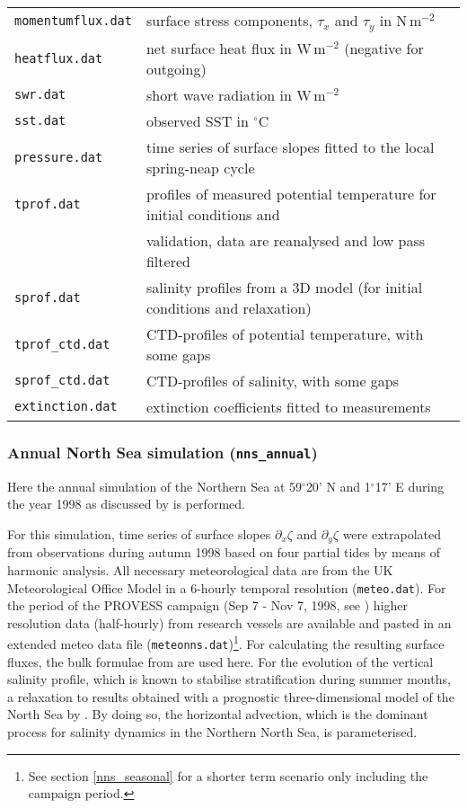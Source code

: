 \begin{tabular}{ll}
{\tt momentumflux.dat}&  surface stress components, $\tau_x$ and $\tau_y$ in N\,m$^{-2}$ \\
{\tt heatflux.dat}    &  net surface heat flux in W\,m$^{-2}$ (negative for outgoing)\\
{\tt swr.dat}         &  short wave radiation in W\,m$^{-2}$ \\ 
{\tt sst.dat}         &  observed SST in $^{\circ}$C \\ 
{\tt pressure.dat}    & time series of surface slopes fitted to the local spring-neap cycle  \\ 
{\tt tprof.dat}       & profiles of measured potential temperature for initial conditions and \\ & validation, data are reanalysed and low pass filtered \\  
{\tt sprof.dat}       & salinity profiles from a 3D model (for initial conditions and relaxation) \\   
{\tt tprof\_ctd.dat}  & CTD-profiles of potential temperature, with some gaps \\
{\tt sprof\_ctd.dat}  & CTD-profiles of salinity, with some gaps \\
{\tt extinction.dat}  & extinction coefficients fitted to measurements \\  
\end{tabular}


\subsubsection{Annual North Sea simulation ({\tt nns\_annual})}\label{nns_annual}

Here the annual simulation of the Northern Sea at 59$^{\circ}$20' N
and 1$^{\circ}$17' E during the year 1998 as discussed
by \cite{Boldingetal2002} is performed.

For this simulation, time series of surface slopes 
$\partial_x \zeta$ and $\partial_y \zeta$ were extrapolated from observations
during autumn 1998 based on four partial tides by means of harmonic analysis.
All necessary meteorological data are from the UK Meteorological Office Model
in a 6-hourly temporal resolution ({\tt meteo.dat}).
For the period of the PROVESS campaign 
(Sep 7 - Nov 7, 1998, see \cite{Howarth_etal_2002,Boldingetal2002})  
higher resolution data (half-hourly) 
from research vessels are available and pasted
in an extended meteo data file ({\tt meteonns.dat})\footnote{See section
\ref{nns_seasonal} 
for a shorter term scenario only including the campaign period.}.
For calculating the resulting surface fluxes, the bulk formulae from
\cite{Kondo75} are used here.
For the evolution of the vertical
salinity profile, which is known to stabilise stratification
during summer months, a relaxation to results obtained with a
prognostic three-dimensional model of the North Sea 
by \cite{Pohlmann96}. 
By doing so, the horizontal advection, which is the dominant process
for salinity dynamics in the Northern North Sea, is parameterised.

